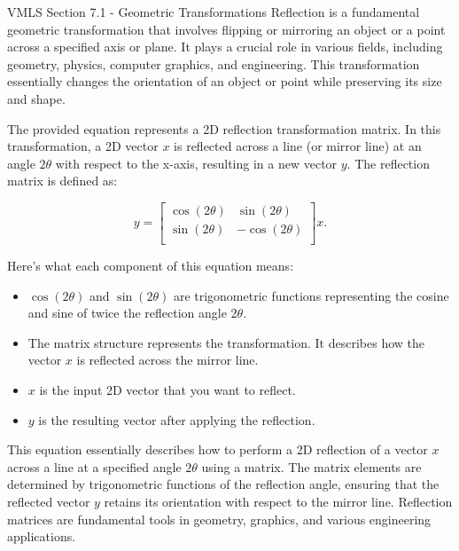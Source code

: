 \begin{notes}{VMLS Section 7.1 - Geometric Transformations}
    Reflection is a fundamental geometric transformation that involves flipping or mirroring an object or a point across a specified axis or plane. It plays a crucial role in various fields, including 
    geometry, physics, computer graphics, and engineering. This transformation essentially changes the orientation of an object or point while preserving its size and shape. \vspace*{1em}

    \begin{Highlight}
        The provided equation represents a 2D reflection transformation matrix. In this transformation, a 2D vector \(x\) is reflected across a line (or mirror line) at an angle \(2\theta\) with respect 
        to the x-axis, resulting in a new vector \(y\). The reflection matrix is defined as:
        
        \begin{equation*}
            y = 
            \begin{bmatrix}
                \cos{(2\theta)} & \sin{(2\theta)} \\
                \sin{(2\theta)} & -\cos{(2\theta)} \\
            \end{bmatrix}
            x.
        \end{equation*}
        
        Here's what each component of this equation means:

        \begin{itemize}
            \item \(\cos{(2\theta)}\) and \(\sin{(2\theta)}\) are trigonometric functions representing the cosine and sine of twice the reflection angle \(2\theta\).
            \item The matrix structure represents the transformation. It describes how the vector \(x\) is reflected across the mirror line.
            \item \(x\) is the input 2D vector that you want to reflect.
            \item \(y\) is the resulting vector after applying the reflection.
        \end{itemize}
        
        This equation essentially describes how to perform a 2D reflection of a vector \(x\) across a line at a specified angle \(2\theta\) using a matrix. The matrix elements are determined by 
        trigonometric functions of the reflection angle, ensuring that the reflected vector \(y\) retains its orientation with respect to the mirror line. Reflection matrices are fundamental tools in 
        geometry, graphics, and various engineering applications.
        

\end{Highlight}
\end{notes}
